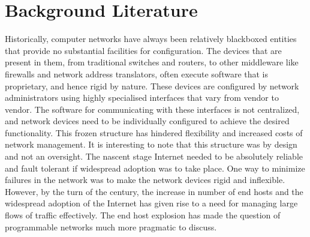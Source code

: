 
\chapter{Background Literature} %

\label{Chapter2} %



Historically, computer networks have always been relatively blackboxed entities that provide no substantial
facilities for configuration. The devices that are present in them, from traditional switches and routers, to other
middleware like firewalls and network address translators, often execute software that is proprietary, and hence
rigid by nature. These devices are configured by network administrators using highly specialised interfaces that vary from vendor to 
vendor. The software for communicating with these interfaces is not centralized, and network devices need to be
individually configured to achieve the desired functionality. This frozen structure has hindered flexibility and
increased costs of network management.
\newline
It is interesting to note that this structure was by design and not an oversight. The nascent stage Internet needed to
be absolutely reliable and fault tolerant if widespread adoption was to take place. One way to minimize failures in the network was
to make the network devices rigid and inflexible. However, by the turn of the century, the increase in number of end 
hosts and the widespread adoption of the Internet has given rise to a need for managing large flows of traffic effectively.
The end host explosion has made the question of programmable networks much more pragmatic to discuss.

